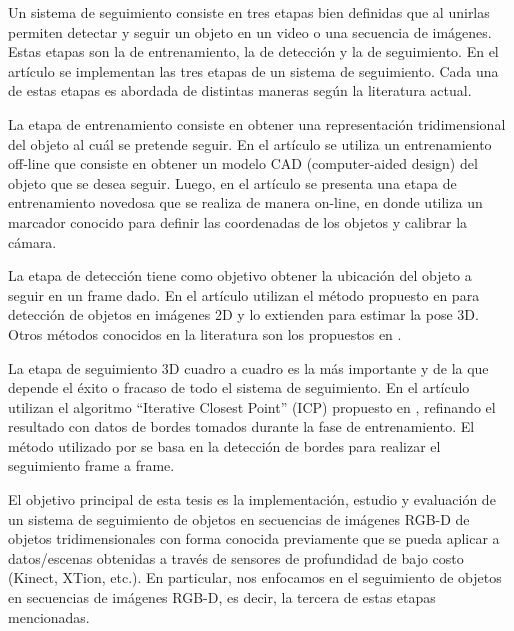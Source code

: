 Un sistema de seguimiento consiste en tres etapas bien definidas que al unirlas permiten detectar y seguir un objeto en un video o una secuencia de imágenes. Estas etapas son la de entrenamiento, la de detección y la de seguimiento. En el artículo \cite{park2011texture} se implementan las tres etapas de un sistema de seguimiento. Cada una de estas etapas es abordada de distintas maneras según la literatura actual.

La etapa de entrenamiento consiste en obtener una representación tridimensional del objeto al cuál se pretende seguir. En el artículo \cite{drummond1999real} se utiliza un entrenamiento off-line que consiste en obtener un modelo CAD (computer-aided design) del objeto que se desea seguir. Luego, en el artículo \cite{park2011texture} se presenta una etapa de entrenamiento novedosa que se realiza de manera on-line, en donde utiliza un marcador conocido para definir las coordenadas de los objetos y calibrar la cámara.

La etapa de detección tiene como objetivo obtener la ubicación del objeto a seguir en un frame dado. En el artículo \cite{park2011texture} utilizan el método propuesto en \cite{hinterstoisser2010dominant} para detección de objetos en imágenes 2D y lo extienden para estimar la pose 3D. Otros métodos conocidos en la literatura son los propuestos en \cite{brunelli2009template,korman13fast}.

La etapa de seguimiento 3D cuadro a cuadro es la más importante y de la que depende el éxito o fracaso de todo el sistema de seguimiento. En el artículo \cite{park2011texture} utilizan el algoritmo ``Iterative Closest Point'' (ICP) propuesto en \cite{zhang94icp,besl92icp}, refinando el resultado con datos de bordes tomados durante la fase de entrenamiento. El método utilizado por \cite{drummond1999real} se basa en la detección de bordes para realizar el seguimiento frame a frame.

El objetivo principal de esta tesis es la implementación, estudio y evaluación de un sistema de seguimiento de objetos en secuencias de imágenes RGB-D de objetos tridimensionales con forma conocida previamente que se pueda aplicar a datos/escenas obtenidas a través de sensores de profundidad de bajo costo (Kinect, XTion, etc.). En particular, nos enfocamos en el seguimiento de objetos en secuencias de imágenes RGB-D, es decir, la tercera de estas etapas mencionadas.

